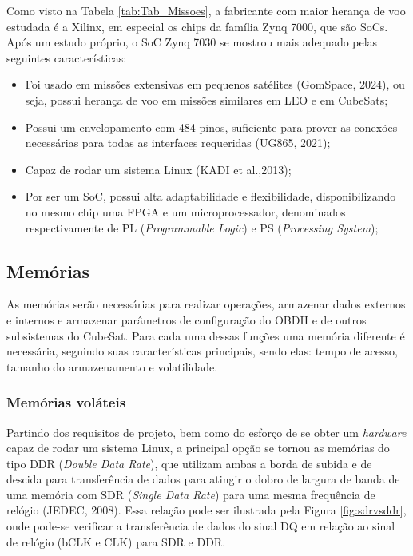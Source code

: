 Como visto na Tabela \ref{tab:Tab_Missoes}, a fabricante com maior herança de voo estudada é a Xilinx, em especial os chips da família Zynq 7000, que são SoCs. Após um estudo próprio, o SoC Zynq 7030 se mostrou mais adequado pelas seguintes características:

\begin{itemize}
	\item Foi usado em missões extensivas em pequenos satélites (GomSpace, 2024), ou seja, possui herança de voo em missões similares em LEO e em CubeSats;
	\item Possui um envelopamento com 484 pinos, suficiente para prover as conexões necessárias para todas as interfaces requeridas (UG865, 2021);
	\item Capaz de rodar um sistema Linux (KADI et al.,2013);
	\item Por ser um SoC, possui alta adaptabilidade e flexibilidade, disponibilizando no mesmo chip uma FPGA e um microprocessador, denominados respectivamente de PL (\textit{Programmable Logic}) e PS (\textit{Processing System});
\end{itemize}

\subsection{Memórias}

As memórias serão necessárias para realizar operações, armazenar dados externos e internos e armazenar parâmetros de configuração do OBDH e de outros subsistemas do CubeSat. Para cada uma dessas funções uma memória diferente é necessária, seguindo suas características principais, sendo elas: tempo de acesso, tamanho do armazenamento e volatilidade.

\subsubsection{Memórias voláteis}

Partindo dos requisitos de projeto, bem como do esforço de se obter um \textit{hardware} capaz de rodar um sistema Linux, a principal opção se tornou as memórias do tipo DDR (\textit{Double Data Rate}), que utilizam ambas a borda de subida e de descida para transferência de dados para atingir o dobro de largura de banda de uma memória com SDR (\textit{Single Data Rate}) para uma mesma frequência de relógio (JEDEC, 2008). Essa relação pode ser ilustrada pela Figura \ref{fig:sdrvsddr}, onde pode-se verificar a transferência de dados do sinal DQ em relação ao sinal de relógio (bCLK e CLK) para SDR e DDR.

